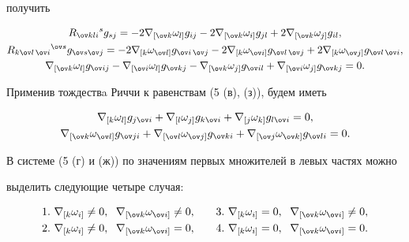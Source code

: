 получить 


\begin{gather} 


R_{\ov k l i}{}^s g_{s j}=-2\nabla_{[\ov k}\omega_{l]} 


g_{i j}-2\nabla_{[\ov k}\omega_{i]}g_{j l}+ 


2\nabla_{[\ov k}\omega_{j]}g_{i l},\\ 


R_{k\ov l\,\ov i}{}^{\ov s}g_{\ov s\ov j}= 


-2\nabla_{[k}\omega_{\ov l]}g_{\ov i\,\ov j}- 


2\nabla_{[k}\omega_{\ov i]}g_{\ov l\,\ov j}+ 


2\nabla_{[k}\omega_{\ov j]}g_{\ov l\,\ov i},\\ 


\nabla_{[\ov k}\omega_{l]}g_{\ov i j}- 


\nabla_{[\ov i}\omega_{l]}g_{\ov k j}- 


\nabla_{[\ov k}\omega_{j]}g_{\ov i l}+ 


\nabla_{[\ov i}\omega_{j]}g_{\ov k j}=0. \notag


\end{gather} 


Применив тождествa Риччи к равенствам (5 (в), (з)), будем иметь 


\begin{gather} 


\nabla_{[k}\omega_{l]}g_{j\ov i}+ 


\nabla_{[l}\omega_{j]}g_{k\ov i}+ 


\nabla_{[j}\omega_{k]}g_{l\ov i}=0,\\ 


\nabla_{[\ov k}\omega_{\ov l]}g_{\ov j i}+ 


\nabla_{[\ov l}\omega_{\ov j]}g_{\ov k i}+ 


\nabla_{[\ov j}\omega_{\ov k]}g_{\ov l i}=0. 


\end{gather} 


 


В системе (5 (г) и (ж)) по значениям первых множителей в левых частях можно 


выделить следующие четыре случая: 


\begin{alignat*}{2} 


& 1.\ \nabla_{[k}\omega_{i]}\ne0, 


\ \; \nabla_{[\ov k}\omega_{\ov i]}\ne0, & \quad 


& 3.\ \nabla_{[k}\omega_{i]}=0, 


\ \; \nabla_{[\ov k}\omega_{\ov i]}\ne0,\\ 


& 2.\ \nabla_{[k}\omega_{i]}\ne0, 


\ \; \nabla_{[\ov k}\omega_{\ov i]}=0, & \quad 


& 4.\ \nabla_{[k}\omega_{i]}=0, 


\ \; \nabla_{[\ov k}\omega_{\ov i]}=0. 


\end{alignat*} 


